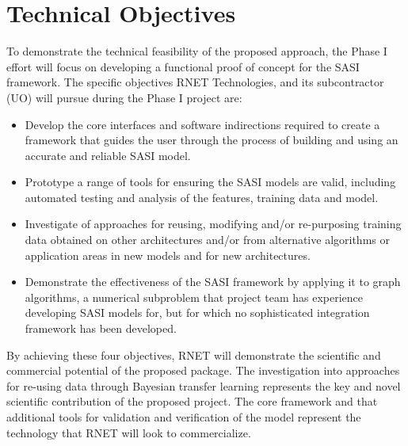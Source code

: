 \section{Technical Objectives}
 
To demonstrate the technical feasibility of the proposed approach, the Phase I effort will focus on developing a functional proof of concept for the SASI framework. The specific objectives RNET Technologies, and its subcontractor (UO) will pursue during the Phase I project are:
\begin{itemize}
  \item Develop the core interfaces and software indirections required to create a framework that 
  guides the user through the process of building and using an accurate and reliable SASI model.
  \item Prototype a range of tools for ensuring the SASI models are valid, including automated testing and analysis of the features, training data and model. 
  \item Investigate of approaches for reusing, modifying and/or re-purposing training data obtained on other architectures and/or from alternative algorithms or application areas in new models and for new architectures. 
  \item Demonstrate the effectiveness of the SASI framework by applying it to graph algorithms, a numerical subproblem that
  project team has experience developing SASI models for, but for which no sophisticated integration framework has been developed. 
\end{itemize}

By achieving these four objectives, RNET will demonstrate the scientific and commercial potential of the proposed package. The investigation into approaches for re-using data through Bayesian transfer learning represents the key and novel scientific contribution of the proposed project. The core framework and that additional tools for validation and verification of the model represent the technology that RNET will look to commercialize. 

